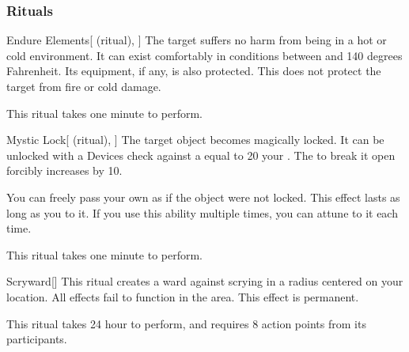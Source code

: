 \subsubsection{Rituals}


\lowercase{\hypertarget{spell:Endure Elements}{}}\label{spell:Endure Elements}
\begin{attuneability}[Rank 1]{\hypertarget{spell:Endure Elements}{Endure Elements}}[ (ritual), ]
The target suffers no harm from being in a hot or cold environment.
It can exist comfortably in conditions between  and 140 degrees Fahrenheit.
Its equipment, if any, is also protected.
This does not protect the target from fire or cold damage.

This ritual takes one minute to perform.
\end{attuneability}
\vspace{0.25em}



\lowercase{\hypertarget{spell:Mystic Lock}{}}\label{spell:Mystic Lock}
\begin{attuneability}[Rank 3]{\hypertarget{spell:Mystic Lock}{Mystic Lock}}[ (ritual), ]
The target object becomes magically locked.
It can be unlocked with a Devices check against a  equal to 20 \add your .
The  to break it open forcibly increases by 10.

You can freely pass your own  as if the object were not locked.
This effect lasts as long as you  to it.
If you use this ability multiple times, you can attune to it each time.

This ritual takes one minute to perform.
\end{attuneability}
\vspace{0.25em}



\lowercase{\hypertarget{spell:Scryward}{}}\label{spell:Scryward}
\begin{apability}[Rank 3]{\hypertarget{spell:Scryward}{Scryward}}[]
\targetrule
This ritual creates a ward against scrying in a \arealarge radius  centered on your location.
All  effects fail to function in the area.
This effect is permanent.

This ritual takes 24 hour to perform, and requires 8 action points from its participants.
\end{apability}
\vspace{0.25em}



